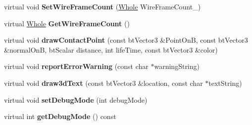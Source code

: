 \begin{DoxyCompactItemize}
\item 
\hypertarget{classphys_1_1debug_1_1InternalDebugDrawer_a76922fda7bb3b59d301e50d67e4f3c72}{
virtual void {\bfseries SetWireFrameCount} (\hyperlink{namespacephys_a460f6bc24c8dd347b05e0366ae34f34a}{Whole} WireFrameCount\_\-)}
\label{db/d27/classphys_1_1debug_1_1InternalDebugDrawer_a76922fda7bb3b59d301e50d67e4f3c72}

\item 
\hypertarget{classphys_1_1debug_1_1InternalDebugDrawer_aa1666e636e6ff81813c0b1a85d7bc157}{
virtual \hyperlink{namespacephys_a460f6bc24c8dd347b05e0366ae34f34a}{Whole} {\bfseries GetWireFrameCount} ()}
\label{db/d27/classphys_1_1debug_1_1InternalDebugDrawer_aa1666e636e6ff81813c0b1a85d7bc157}

\item 
\hypertarget{classphys_1_1debug_1_1InternalDebugDrawer_a8b912aaff8dfd9f4e97ffb2d867121b2}{
virtual void {\bfseries drawContactPoint} (const btVector3 \&PointOnB, const btVector3 \&normalOnB, btScalar distance, int lifeTime, const btVector3 \&color)}
\label{db/d27/classphys_1_1debug_1_1InternalDebugDrawer_a8b912aaff8dfd9f4e97ffb2d867121b2}

\item 
\hypertarget{classphys_1_1debug_1_1InternalDebugDrawer_a4e3b4cbc861f76696b4d32f0cf068ea6}{
virtual void {\bfseries reportErrorWarning} (const char $\ast$warningString)}
\label{db/d27/classphys_1_1debug_1_1InternalDebugDrawer_a4e3b4cbc861f76696b4d32f0cf068ea6}

\item 
\hypertarget{classphys_1_1debug_1_1InternalDebugDrawer_a1266d3fad8868ade2d515e9c92e76b4a}{
virtual void {\bfseries draw3dText} (const btVector3 \&location, const char $\ast$textString)}
\label{db/d27/classphys_1_1debug_1_1InternalDebugDrawer_a1266d3fad8868ade2d515e9c92e76b4a}

\item 
\hypertarget{classphys_1_1debug_1_1InternalDebugDrawer_a63059b273ed6031a393b2d994b820bcc}{
virtual void {\bfseries setDebugMode} (int debugMode)}
\label{db/d27/classphys_1_1debug_1_1InternalDebugDrawer_a63059b273ed6031a393b2d994b820bcc}

\item 
\hypertarget{classphys_1_1debug_1_1InternalDebugDrawer_aba329861569d741e970ce5aafb668e84}{
virtual int {\bfseries getDebugMode} () const }
\label{db/d27/classphys_1_1debug_1_1InternalDebugDrawer_aba329861569d741e970ce5aafb668e84}

\end{DoxyCompactItemize}


